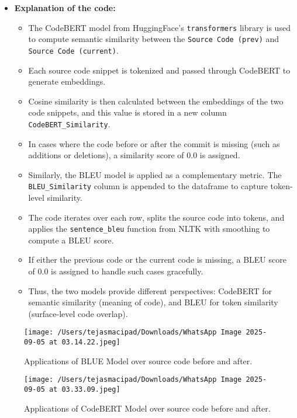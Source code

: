 \documentclass[12pt, a4paper]{report}
\begin{document}
\begin{itemize}
        \begin{itemize}
            \item \textbf{Explanation of the code:}
            \begin{itemize}
                \item The CodeBERT model from HuggingFace’s \texttt{transformers} library is used to compute semantic similarity between the \texttt{Source Code (prev)} and \texttt{Source Code (current)}. 
                \item Each source code snippet is tokenized and passed through CodeBERT to generate embeddings. 
                \item Cosine similarity is then calculated between the embeddings of the two code snippets, and this value is stored in a new column \texttt{CodeBERT\_Similarity}.
                \item In cases where the code before or after the commit is missing (such as additions or deletions), a similarity score of 0.0 is assigned.
                \item Similarly, the BLEU model is applied as a complementary metric. The \texttt{BLEU\_Similarity} column is appended to the dataframe to capture token-level similarity. 
                \item The code iterates over each row, splits the source code into tokens, and applies the \texttt{sentence\_bleu} function from NLTK with smoothing to compute a BLEU score. 
                \item If either the previous code or the current code is missing, a BLEU score of 0.0 is assigned to handle such cases gracefully. 
                \item Thus, the two models provide different perspectives: CodeBERT for semantic similarity (meaning of code), and BLEU for token similarity (surface-level code overlap).
            \end{itemize}
        \end{itemize}


        \begin{figure}[!h] 
            \centering
            \texttt{[image: /Users/tejasmacipad/Downloads/WhatsApp Image 2025-09-05 at 03.14.22.jpeg]}
            \caption{Applications of BLUE Model over source code before and after.}
            \label{fig:diff-example-11}
        \end{figure}

        \begin{figure}[!h] 
            \centering
            \texttt{[image: /Users/tejasmacipad/Downloads/WhatsApp Image 2025-09-05 at 03.33.09.jpeg]}
            \caption{Applications of CodeBERT Model over source code before and after.}
            \label{fig:diff-example-12}
        \end{figure}
    \end{itemize}
\end{document}

